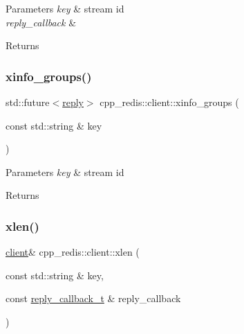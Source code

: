 \begin{DoxyParams}{Parameters}
{\em key} & stream id \\
\hline
{\em reply\+\_\+callback} & \\
\hline
\end{DoxyParams}
\begin{DoxyReturn}{Returns}

\end{DoxyReturn}
\mbox{\label{classcpp__redis_1_1client_a7c8b502b2d339556f208c36513c94723}} 
\subsubsection{\texorpdfstring{xinfo\+\_\+groups()}{xinfo\_groups()}\hspace{0.1cm}{\footnotesize\ttfamily [2/2]}}
{\footnotesize\ttfamily std\+::future$<$\mbox{\hyperlink{classcpp__redis_1_1reply}{reply}}$>$ cpp\+\_\+redis\+::client\+::xinfo\+\_\+groups (\begin{DoxyParamCaption}\item[{const std\+::string \&}]{key }\end{DoxyParamCaption})}






\begin{DoxyParams}{Parameters}
{\em key} & stream id \\
\hline
\end{DoxyParams}
\begin{DoxyReturn}{Returns}

\end{DoxyReturn}
\mbox{\label{classcpp__redis_1_1client_a31bd2e133d34097af085e3e024c14a0f}} 
\subsubsection{\texorpdfstring{xlen()}{xlen()}\hspace{0.1cm}{\footnotesize\ttfamily [1/2]}}
{\footnotesize\ttfamily \mbox{\hyperlink{classcpp__redis_1_1client}{client}}\& cpp\+\_\+redis\+::client\+::xlen (\begin{DoxyParamCaption}\item[{const std\+::string \&}]{key,  }\item[{const \mbox{\hyperlink{classcpp__redis_1_1client_af7a65eb21aa25230bfbb0b0203c4fc04}{reply\+\_\+callback\+\_\+t}} \&}]{reply\+\_\+callback }\end{DoxyParamCaption})}



